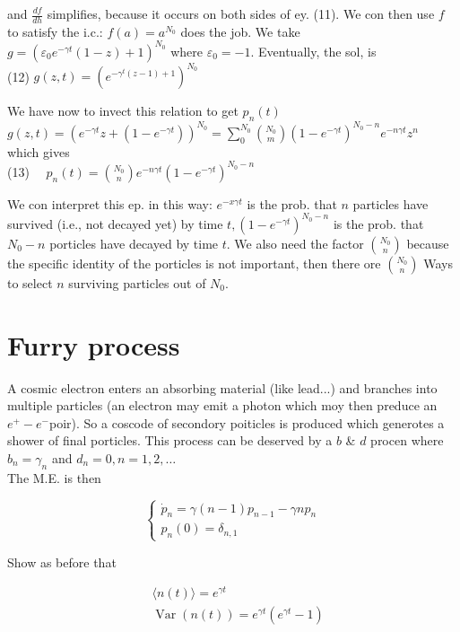 \documentclass[10pt]{article}
\begin{document}
and $\frac{d f}{d h}$ simplifies, because it occurs on both sides of ey. (11). We con then use $f$ to satisfy the i.c.: $f(a)=a^{N_{0}}$ does the job. We take $g=\left(\varepsilon_{0} e^{-\gamma t}(1-z)+1\right)^{N_{0}}$ where $\varepsilon_{0}=-1$. Eventually, the sol, is\\
(12) $g(z, t)=\left(e^{-\gamma^{t}(z-1)+1}\right)^{N_{0}}$

We have now to invect this relation to get $p_{n}(t)$\\
$g(z, t)=\left(e^{-\gamma t} z+\left(1-e^{-\gamma t}\right)\right)^{N_{0}}=\sum_{0}^{N_{0}}\binom{N_{0}}{m}\left(1-e^{-\gamma t}\right)^{N_{0}-n} e^{-n \gamma t} z^{n}$\\
which gives\\
(13) $\quad p_{n}(t)=\binom{N_{0}}{n} e^{-n \gamma t}\left(1-e^{-\gamma t}\right)^{N_{0}-n}$

We con interpret this ep. in this way: $e^{-x \gamma t}$ is the prob. that $n$ particles have survived (i.e., not decayed yet) by time $t,\left(1-e^{-\gamma t}\right)^{N_{0}-n}$ is the prob. that $N_{0}-n$ porticles have decayed by time $t$. We also need the factor $\binom{N_{0}}{n}$ because the specific identity of the porticles is not important, then there ore $\binom{N_{0}}{n}$ Ways to select $n$ surviving particles out of $N_{0}$.

\section*{Furry process}
A cosmic electron enters an absorbing material (like lead...) and branches into multiple particles (an electron may emit a photon which moy then preduce an $e^{+}-e^{-}$poir). So a coscode of secondory poiticles is produced which generotes a shower of final porticles. This process can be deserved by a $b$ \& $d$ procen where $b_{n}=\gamma_{n}$ and $d_{n}=0, n=1,2, \ldots$\\
The M.E. is then

$$
\left\{\begin{array}{l}
\dot{p}_{n}=\gamma(n-1) p_{n-1}-\gamma n p_{n} \\
p_{n}(0)=\delta_{n, 1}
\end{array}\right.
$$

Show as before that

$$
\begin{aligned}
& \langle n(t)\rangle=e^{\gamma t} \\
& \operatorname{Var}(n(t))=e^{\gamma t}\left(e^{\gamma t}-1\right)
\end{aligned}
$$
\end{document}
